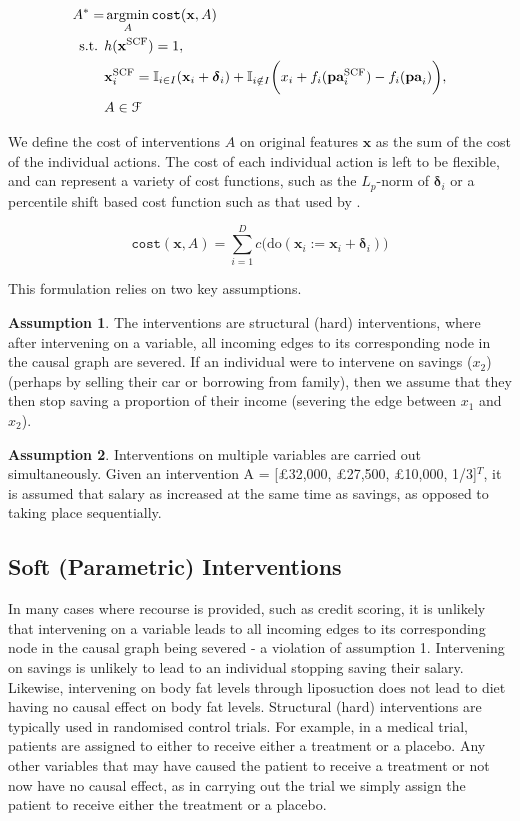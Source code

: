 \begin{align} \label{eq:causal_recourse_problem_hard}
	A^* = & \operatorname*{argmin}_{A} \texttt{cost}(\mathbf{x}, A) \\ \nonumber
	\text{s.t. } & h(\mathbf{x}^{\text{SCF}}) = 1, \\ \nonumber
	& \mathbf{x}^{\text{SCF}}_i = \mathbb{I}_{i \in I} (\mathbf{x}_i + \boldsymbol{\delta}_i) + \mathbb{I}_{i \notin I} \bigg(x_i + f_i(\textbf{pa}^{\text{SCF}}_i) - f_i(\textbf{pa}_i)\bigg), \\ \nonumber
	& A \in \mathcal{F}
\end{align}

We define the cost of interventions $A$ on original features $\mathbf{x}$ as the sum of the cost of the individual actions. The cost of each individual action is left to be flexible, and can represent a variety of cost functions, such as the $L_p$-norm of $\boldsymbol{\delta}_i$ or a percentile shift based cost function such as that used by \textcite{ustunActionableRecourseLinear2019}.

\begin{equation}
	\texttt{cost}(\mathbf{x}, A) = \sum_{i=1}^{D} c \bigg(\text{do}(\mathbf{x}_i:=\mathbf{x}_i + \boldsymbol{\delta}_i) \bigg)
\end{equation}

This formulation relies on two key assumptions.

\textbf{Assumption 1}. The interventions are structural (hard) interventions, where after intervening on a variable, all incoming edges to its corresponding node in the causal graph are severed. If an individual were to intervene on savings ($x_2$) (perhaps by selling their car or borrowing from family), then we assume that they then stop saving a proportion of their income (severing the edge between $x_1$ and $x_2$).

\textbf{Assumption 2}. Interventions on multiple variables are carried out simultaneously. Given an intervention A = [£32,000, £27,500, £10,000, 1/3]$^T$, it is assumed that salary as increased at the same time as savings, as opposed to taking place sequentially.

\subsection{Soft (Parametric) Interventions} \label{section:soft_interventions}

In many cases where recourse is provided, such as credit scoring, it is unlikely that intervening on a variable leads to all incoming edges to its corresponding node in the causal graph being severed - a violation of assumption 1. Intervening on savings is unlikely to lead to an individual stopping saving their salary. Likewise, intervening on body fat levels through liposuction does not lead to diet having no causal effect on body fat levels. Structural (hard) interventions are typically used in randomised control trials. For example, in a medical trial, patients are assigned to either to receive either a treatment or a placebo. Any other variables that may have caused the patient to receive a treatment or not now have no causal effect, as in carrying out the trial we simply assign the patient to receive either the treatment or a placebo.

